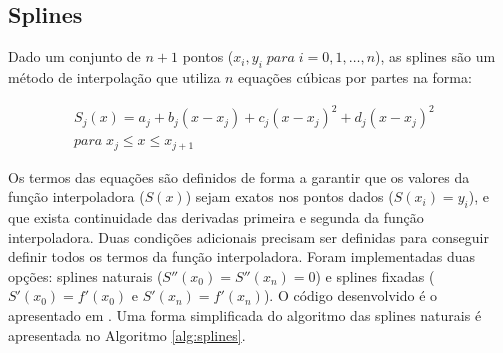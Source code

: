 \documentclass[final,5p]{elsarticle}
\numberwithin{equation}{section}
\begin{document}
    \subsection{Splines}
    
        Dado um conjunto de $n+1$ pontos ($x_i,y_i \; para \; i=0,1,\ldots,n$), as splines são um método de interpolação que utiliza $n$ equações cúbicas por partes na forma:
        
        \begin{align*}
            S_j(x) = a_j + b_j (x-x_j) + c_j (x-x_j)^2 + d_j (x-x_j)^2& \\
            para \; x_j \le x \le x_{j+1}&
        \end{align*}
        
        Os termos das equações são definidos de forma a garantir que os valores da função interpoladora ($S(x)$) sejam exatos nos pontos dados ($S(x_i)=y_i$), e que exista continuidade das derivadas primeira e segunda da função interpoladora. Duas condições adicionais precisam ser definidas para conseguir definir todos os termos da função interpoladora. Foram implementadas duas opções: splines naturais ($S''(x_0)=S''(x_n)=0$) e splines  fixadas ($S'(x_0)=f'(x_0)$ e $S'(x_n)=f'(x_n)$). O código desenvolvido é o apresentado em \cite{burden2016analise}. Uma forma simplificada do algoritmo das splines naturais é apresentada no Algoritmo \ref{alg:splines}. 
\end{document}
